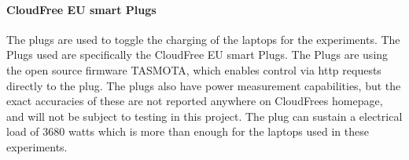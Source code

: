 \paragraph*{CloudFree EU smart Plugs}
The plugs are used to toggle the charging of the laptops for the experiments. The Plugs used are specifically the CloudFree EU smart Plugs. The Plugs are using the open source firmware TASMOTA\cite{TomatoGit}, which enables control via http requests directly to the plug. The plugs also have power measurement capabilities, but the exact accuracies of these are not reported anywhere on CloudFrees homepage, and will not be subject to testing in this project. The plug can sustain a electrical load of 3680 watts which is more than enough for the laptops used in these experiments.